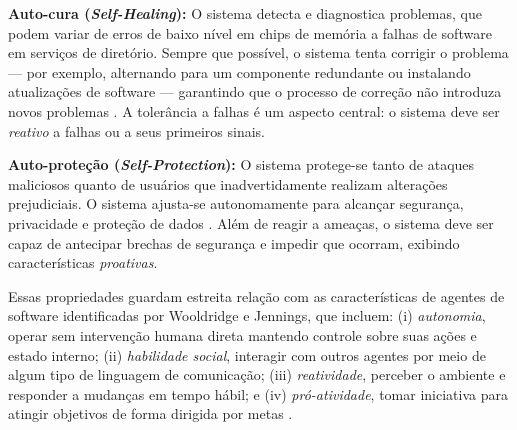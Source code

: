 \textbf{Auto-cura (\textit{Self-Healing}):} O sistema detecta e diagnostica problemas, que podem variar de erros de baixo nível em chips de memória a falhas de software em serviços de diretório. Sempre que possível, o sistema tenta corrigir o problema --- por exemplo, alternando para um componente redundante ou instalando atualizações de software --- garantindo que o processo de correção não introduza novos problemas \cite{W1999392360}. A tolerância a falhas é um aspecto central: o sistema deve ser \textit{reativo} a falhas ou a seus primeiros sinais.

\textbf{Auto-proteção (\textit{Self-Protection}):} O sistema protege-se tanto de ataques maliciosos quanto de usuários que inadvertidamente realizam alterações prejudiciais. O sistema ajusta-se autonomamente para alcançar segurança, privacidade e proteção de dados \cite{W1999392360}. Além de reagir a ameaças, o sistema deve ser capaz de antecipar brechas de segurança e impedir que ocorram, exibindo características \textit{proativas}.

Essas propriedades guardam estreita relação com as características de agentes de software identificadas por Wooldridge e Jennings, que incluem: (i) \textit{autonomia}, operar sem intervenção humana direta mantendo controle sobre suas ações e estado interno; (ii) \textit{habilidade social}, interagir com outros agentes por meio de algum tipo de linguagem de comunicação; (iii) \textit{reatividade}, perceber o ambiente e responder a mudanças em tempo hábil; e (iv) \textit{pró-atividade}, tomar iniciativa para atingir objetivos de forma dirigida por metas \cite{W1999392360}.

